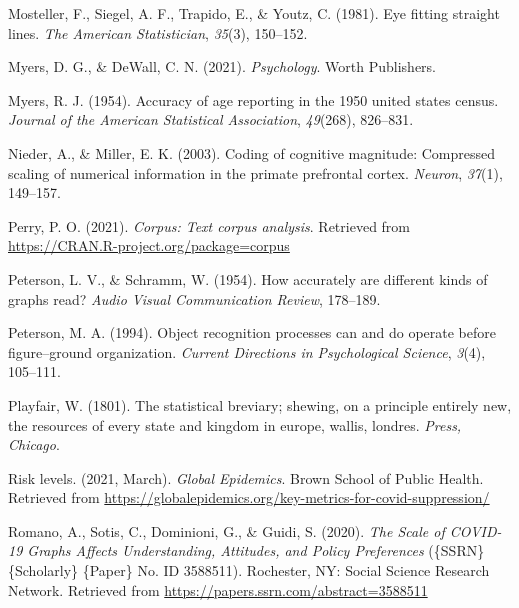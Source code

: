 \documentclass[print]{nuthesis}
\newlength{\cslhangindent}
\newenvironment{CSLReferences}[2]%
{\setlength{\parindent}{0pt}%
\everypar{\setlength{\hangindent}{\cslhangindent}}\ignorespaces}%
{\par}
\begin{document}
\begin{CSLReferences}{1}{0}
\leavevmode{}%
Mosteller, F., Siegel, A. F., Trapido, E., \& Youtz, C. (1981). Eye fitting straight lines. \emph{The American Statistician}, \emph{35}(3), 150--152.

\leavevmode{}%
Myers, D. G., \& DeWall, C. N. (2021). \emph{Psychology}. Worth Publishers.

\leavevmode{}%
Myers, R. J. (1954). Accuracy of age reporting in the 1950 united states census. \emph{Journal of the American Statistical Association}, \emph{49}(268), 826--831.

\leavevmode{}%
Nieder, A., \& Miller, E. K. (2003). Coding of cognitive magnitude: Compressed scaling of numerical information in the primate prefrontal cortex. \emph{Neuron}, \emph{37}(1), 149--157.

\leavevmode{}%
Perry, P. O. (2021). \emph{Corpus: Text corpus analysis}. Retrieved from \url{https://CRAN.R-project.org/package=corpus}

\leavevmode{}%
Peterson, L. V., \& Schramm, W. (1954). How accurately are different kinds of graphs read? \emph{Audio Visual Communication Review}, 178--189.

\leavevmode{}%
Peterson, M. A. (1994). Object recognition processes can and do operate before figure--ground organization. \emph{Current Directions in Psychological Science}, \emph{3}(4), 105--111.

\leavevmode{}%
Playfair, W. (1801). The statistical breviary; shewing, on a principle entirely new, the resources of every state and kingdom in europe, wallis, londres. \emph{Press, Chicago}.

\leavevmode{}%
Risk levels. (2021, March). \emph{Global Epidemics}. Brown School of Public Health. Retrieved from \url{https://globalepidemics.org/key-metrics-for-covid-suppression/}

\leavevmode{}%
Romano, A., Sotis, C., Dominioni, G., \& Guidi, S. (2020). \emph{The {Scale} of {COVID}-19 {Graphs} {Affects} {Understanding}, {Attitudes}, and {Policy} {Preferences}} (\{SSRN\} \{Scholarly\} \{Paper\} No. ID 3588511). Rochester, NY: Social Science Research Network. Retrieved from \url{https://papers.ssrn.com/abstract=3588511}


\end{CSLReferences}
\end{document}
